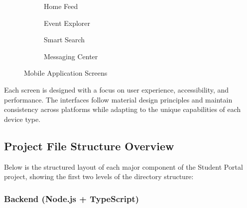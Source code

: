 \begin{figure}[H]
    \centering
    \begin{subfigure}[b]{0.22\textwidth}
        \centering
        \caption{Home Feed}
        \label{fig:mobile-home}
    \end{subfigure}
    \hfill
    \begin{subfigure}[b]{0.22\textwidth}
        \centering
        \caption{Event Explorer}
        \label{fig:mobile-events}
    \end{subfigure}
    \hfill
    \begin{subfigure}[b]{0.22\textwidth}
        \centering
        \caption{Smart Search}
        \label{fig:mobile-search}
    \end{subfigure}
    \hfill
    \begin{subfigure}[b]{0.22\textwidth}
        \centering
        \caption{Messaging Center}
        \label{fig:mobile-messaging}
    \end{subfigure}
    \caption{Mobile Application Screens}
    \label{fig:mobile_screens}
\end{figure}

Each screen is designed with a focus on user experience, accessibility, and performance. The interfaces follow material design principles and maintain consistency across platforms while adapting to the unique capabilities of each device type.

\subsection{Project File Structure Overview}
\label{subsec:file_structure}

Below is the structured layout of each major component of the Student Portal project, showing the first two levels of the directory structure:

\subsubsection{Backend (Node.js + TypeScript)}

